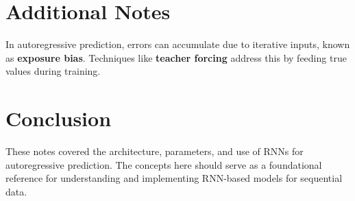 \documentclass{article}
\begin{document}
\section{Additional Notes}
In autoregressive prediction, errors can accumulate due to iterative inputs, known as \textbf{exposure bias}. Techniques like \textbf{teacher forcing} address this by feeding true values during training.

\section{Conclusion}
These notes covered the architecture, parameters, and use of RNNs for autoregressive prediction. The concepts here should serve as a foundational reference for understanding and implementing RNN-based models for sequential data.
\end{document}
